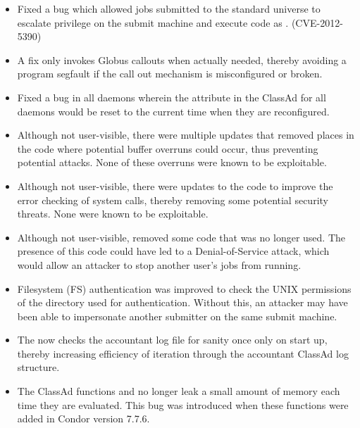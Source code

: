 \begin{itemize}

\item \Security Fixed a bug which allowed jobs submitted to the standard
universe to escalate privilege on the submit machine and execute code as 
.
(CVE-2012-5390)

\item A fix only invokes Globus callouts when actually needed, 
thereby avoiding a program segfault if
the call out mechanism is misconfigured or broken.

\item Fixed a bug in all daemons wherein the  attribute 
in the ClassAd for all daemons would be reset to the current time when they are
reconfigured.

\item \Security Although not user-visible, 
there were multiple updates that removed places
in the code where potential buffer overruns could occur, 
thus preventing potential attacks.  
None of these overruns were known to be exploitable.

\item \Security Although not user-visible, 
there were updates to the code to improve
the error checking of system calls,
thereby removing some potential security threats.  
None were known to be exploitable.

\item \Security Although not user-visible, 
removed some code that was no longer used.
The presence of this code could have led to a Denial-of-Service attack,
which would allow an attacker to stop another user's jobs from running.

\item \Security Filesystem (FS) authentication was improved to check 
the UNIX permissions of the directory used for authentication.  
Without this, an attacker may have
been able to impersonate another submitter on the same submit machine.

\item The  now checks the accountant log file for sanity
once only on start up,  
thereby increasing efficiency of iteration through 
the accountant ClassAd log structure.

\item The ClassAd functions  and 
no longer leak a small amount of memory each time they are evaluated.  
This bug was introduced when these functions were added in Condor version 7.7.6.


\end{itemize}
